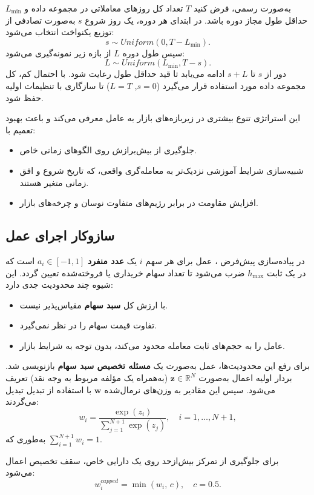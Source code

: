 \documentclass[12pt, a4paper]{report}
\begin{document}
به‌صورت رسمی، فرض کنید $T$ تعداد کل روزهای معاملاتی در مجموعه داده و $L_{\min}$ حداقل طول مجاز دوره باشد.  
در ابتدای هر دوره، یک روز شروع $s$ به‌صورت تصادفی از توزیع یکنواخت انتخاب می‌شود:
\[
s \sim Uniform(0, T - L_{\min}).
\]
سپس طول دوره $L$ از بازه زیر نمونه‌گیری می‌شود:
\[
L \sim Uniform(L_{\min}, T - s).
\]
دور از $s$ تا $s + L$ ادامه می‌یابد تا قید حداقل طول رعایت شود.  
با احتمال کم، کل مجموعه داده مورد استفاده قرار می‌گیرد ($s=0$, $L=T$) تا سازگاری با تنظیمات اولیه حفظ شود.  

این استراتژی تنوع بیشتری در زیر‌بازه‌های بازار به عامل معرفی می‌کند و باعث بهبود تعمیم با:
\begin{itemize}
    \item جلوگیری از بیش‌برازش روی الگوهای زمانی خاص.  
    \item شبیه‌سازی شرایط آموزشی نزدیک‌تر به معامله‌گری واقعی، که تاریخ شروع و افق زمانی متغیر هستند.  
    \item افزایش مقاومت در برابر رژیم‌های متفاوت نوسان و چرخه‌های بازار.  
\end{itemize}

\subsection{سازوکار اجرای عمل}

در پیاده‌سازی پیش‌فرض ، عمل برای هر سهم $i$ یک \textbf{عدد منفرد} 
$a_i \in [-1,1]$ است که در یک ثابت $h_{\max}$ ضرب می‌شود تا تعداد سهام خریداری یا فروخته‌شده تعیین گردد.  
این شیوه چند محدودیت جدی دارد:
\begin{itemize}
    \item با ارزش کل \textbf{سبد سهام} مقیاس‌پذیر نیست.  
    \item تفاوت قیمت سهام را در نظر نمی‌گیرد.  
    \item عامل را به حجم‌های ثابت معامله محدود می‌کند، بدون توجه به شرایط بازار.  
\end{itemize}

برای رفع این محدودیت‌ها، عمل به‌صورت یک \textbf{مسئله تخصیص سبد سهام} بازنویسی شد.  
بردار اولیه اعمال به‌صورت $\mathbf{z} \in \mathbb{R}^N$ (به‌همراه یک مؤلفه مربوط به وجه نقد) تعریف می‌شود.  
سپس این مقادیر به وزن‌های نرمال‌شده $\mathbf{w}$ با استفاده از تبدیل  تبدیل می‌گردند:
\[
w_i = \frac{\exp(z_i)}{\sum_{j=1}^{N+1} \exp(z_j)}, \quad i=1,\dots,N+1,
\]
به‌طوری که $\sum_{i=1}^{N+1} w_i = 1$.  

برای جلوگیری از تمرکز بیش‌ازحد روی یک دارایی خاص، سقف تخصیص اعمال می‌شود:
\[
w_i^{capped} = \min(w_i, \, c), \quad c=0.5.
\]
\end{document}
